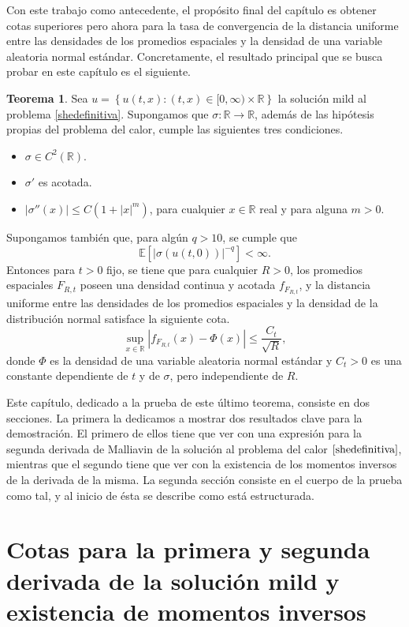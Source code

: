 \documentclass[letterpaper,twoside,12pt]{book}
\newcommand{\R}{\mathbb{R}}
\newcommand{\E}{\mathbb{E}}
\newcommand{\1}{\mathds{1}}
\newcommand{\abs}[1]{\left\lvert #1 \right\rvert}
\renewcommand{\to}{\rightarrow}
\theoremstyle{definition}
\theoremstyle{definition}
\newtheorem{teo}{Teorema}
\theoremstyle{remark}
\theoremstyle{definition}
\theoremstyle{definition}
\theoremstyle{definition}
\theoremstyle{definition}
\theoremstyle{definition}
\begin{document}
Con este trabajo como antecedente, el propósito final del capítulo es obtener cotas superiores pero ahora para la tasa de convergencia de la distancia uniforme entre las densidades de los promedios espaciales y la densidad de una variable aleatoria normal estándar. Concretamente, el resultado principal que se busca probar en este capítulo es el siguiente.
\begin{teo}\label{teoremaprincipal}
Sea $u=\left\{u(t,x):(t,x)\in [0,\infty)\times\R\right\}$ la solución mild al problema \eqref{shedefinitiva}. Supongamos que $\sigma:\R\to\R$, además de las hipótesis propias del problema del calor, cumple las siguientes tres condiciones.
\begin{itemize}
   \item $\sigma\in C^2(\R)$.
   \item $\sigma'$ es acotada.
   \item $\abs{\sigma''(x)}\leq C(1+\abs{x}^{m})$, \qquad para cualquier $x\in \R$ real y para alguna $m>0$.
\end{itemize}
Supongamos también que, para algún $q>10$, se cumple que 
\[
\E\left[\abs{\sigma(u(t,0))}^{-q}\right]<\infty.    
\]
Entonces para $t>0$ fijo, se tiene que para cualquier $R>0$, los promedios espaciales $F_{R,t}$ poseen una densidad continua y acotada $f_{F_{R,t}}$, y la distancia uniforme entre las densidades de los promedios espaciales y la densidad de la distribución normal satisface la siguiente cota.  
\[
\sup_{x\in \R} \abs{f_{F_{R,t}}(x)-\Phi(x)}\leq \frac{C_t}{\sqrt{R}},   
\]
donde $\Phi$ es la densidad de una variable aleatoria normal estándar y $C_t>0$ es una constante dependiente de $t$ y de $\sigma$, pero independiente de $R$.
\end{teo}

Este capítulo, dedicado a la prueba de este último teorema, consiste en dos secciones. La primera la dedicamos a mostrar dos resultados clave para la demostración. El primero de ellos tiene que ver con una expresión para la segunda derivada de Malliavin de la solución al problema del calor $\eqref{shedefinitiva}$, mientras que el segundo tiene que ver con la existencia de los momentos inversos de la derivada de la misma. La segunda sección consiste en el cuerpo de la prueba como tal, y al inicio de ésta se describe como está estructurada.

\section{Cotas para la primera y segunda derivada de la solución mild y existencia de momentos inversos}
\end{document}
